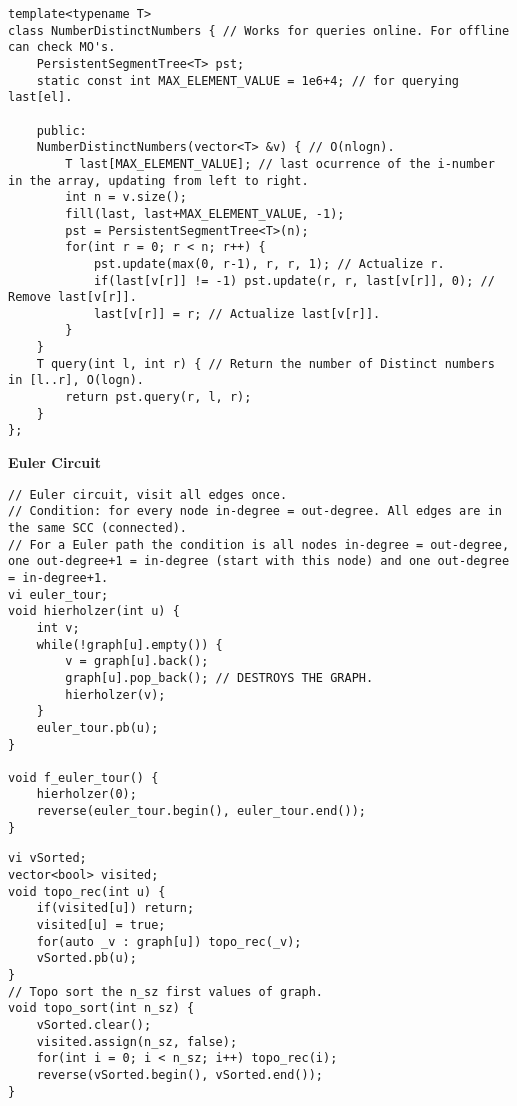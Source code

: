 \documentclass[a4paper,10pt]{article}
\newcommand{\titleAlg}[1]{\vspace{-10pt}
\begin{center}\textbf{#1}\end{center} \vspace{-10pt}}
\begin{document}
\begin{multicols}{2}
\begin{verbatim}
template<typename T>
class NumberDistinctNumbers { // Works for queries online. For offline can check MO's.
    PersistentSegmentTree<T> pst;
    static const int MAX_ELEMENT_VALUE = 1e6+4; // for querying last[el].

    public:
    NumberDistinctNumbers(vector<T> &v) { // O(nlogn).
        T last[MAX_ELEMENT_VALUE]; // last ocurrence of the i-number in the array, updating from left to right.
        int n = v.size();
        fill(last, last+MAX_ELEMENT_VALUE, -1);
        pst = PersistentSegmentTree<T>(n);
        for(int r = 0; r < n; r++) {
            pst.update(max(0, r-1), r, r, 1); // Actualize r.
            if(last[v[r]] != -1) pst.update(r, r, last[v[r]], 0); // Remove last[v[r]].
            last[v[r]] = r; // Actualize last[v[r]].
        }
    }
    T query(int l, int r) { // Return the number of Distinct numbers in [l..r], O(logn).
        return pst.query(r, l, r);
    }
};

\end{verbatim}
\end{multicols}

\titleAlg{Euler Circuit}
\begin{multicols}{2}
\begin{verbatim}
// Euler circuit, visit all edges once.
// Condition: for every node in-degree = out-degree. All edges are in the same SCC (connected).
// For a Euler path the condition is all nodes in-degree = out-degree, one out-degree+1 = in-degree (start with this node) and one out-degree = in-degree+1.
vi euler_tour;
void hierholzer(int u) {
    int v;
    while(!graph[u].empty()) {
        v = graph[u].back(); 
        graph[u].pop_back(); // DESTROYS THE GRAPH.
        hierholzer(v);
    }
    euler_tour.pb(u);
}

void f_euler_tour() {
    hierholzer(0);
    reverse(euler_tour.begin(), euler_tour.end());
}
\end{verbatim}
\end{multicols}

\begin{multicols}{2}
\begin{verbatim}
vi vSorted;
vector<bool> visited;
void topo_rec(int u) {
    if(visited[u]) return;
    visited[u] = true;
    for(auto _v : graph[u]) topo_rec(_v);
    vSorted.pb(u);
}
// Topo sort the n_sz first values of graph.
void topo_sort(int n_sz) {
    vSorted.clear(); 
    visited.assign(n_sz, false);
    for(int i = 0; i < n_sz; i++) topo_rec(i);
    reverse(vSorted.begin(), vSorted.end());
}
\end{verbatim}
\end{multicols}
\end{document}
